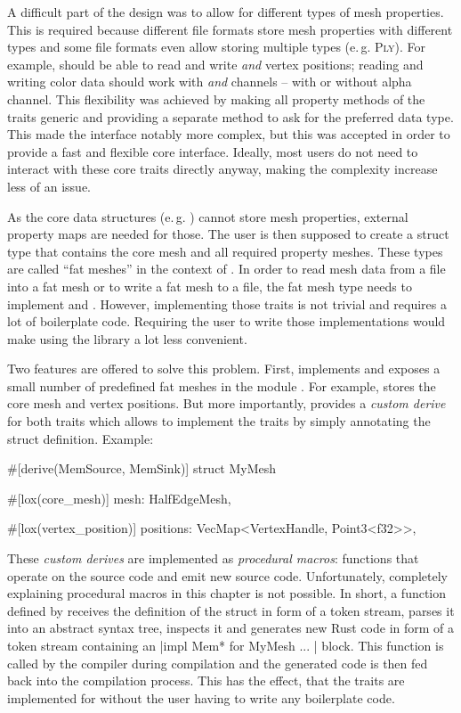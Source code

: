 A difficult part of the design was to allow for different types of mesh properties.
This is required because different file formats store mesh properties with different types and some file formats even allow storing multiple types (e.\,g. \textsc{Ply}).
For example,  should be able to read and write  \emph{and}  vertex positions;
reading and writing color data should work with  \emph{and}  channels -- with or without alpha channel.
This flexibility was achieved by making all property methods of the  traits generic and providing a separate method to ask for the preferred data type.
This made the interface notably more complex, but this was accepted in order to provide a fast and flexible core interface.
Ideally, most users do not need to interact with these core traits directly anyway, making the complexity increase less of an issue.

As the core data structures (e.\,g. ) cannot store mesh properties, external property maps are needed for those.
The user is then supposed to create a struct type that contains the core mesh and all required property meshes.
These types are called \enquote{fat meshes} in the context of .
In order to read mesh data from a file into a fat mesh or to write a fat mesh to a file, the fat mesh type needs to implement  and .
However, implementing those traits is not trivial and requires a lot of boilerplate code.
Requiring the user to write those implementations would make using the library a lot less convenient.

Two features are offered to solve this problem.
First,  implements and exposes a small number of predefined fat meshes in the module .
For example,  stores the core mesh and  vertex positions.
But more importantly,  provides a \emph{custom derive} for both  traits which allows to implement the traits by simply annotating the struct definition.
Example:

\begin{rustcode}
#[derive(MemSource, MemSink)]
struct MyMesh {
    #[lox(core_mesh)]
    mesh: HalfEdgeMesh,

    #[lox(vertex_position)]
    positions: VecMap<VertexHandle, Point3<f32>>,
}
\end{rustcode}

These \emph{custom derives} are implemented as \emph{procedural macros}: functions that operate on the source code and emit new source code.
Unfortunately, completely explaining procedural macros in this chapter is not possible.
In short, a function defined by  receives the definition of the struct  in form of a token stream, parses it into an abstract syntax tree, inspects it and generates new Rust code in form of a token stream containing an \code|impl Mem* for MyMesh { ... }| block.
This function is called by the compiler during compilation and the generated code is then fed back into the compilation process.
This has the effect, that the  traits are implemented for  without the user having to write any boilerplate code.

